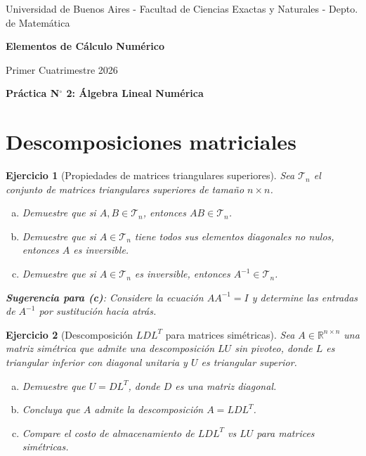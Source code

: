 \documentclass[12pt]{article}
\newtheorem{exercise}{Ejercicio}
\begin{document}
\centerline{{\small Universidad de Buenos Aires - Facultad de Ciencias Exactas y Naturales - Depto. de Matemática}}
 
 \vskip 0.2cm
 \hrulefill
 \vskip 0.2cm

 \centerline{{\bf\Huge {\sc Elementos de Cálculo Numérico}}}
 \vskip 0.2cm
 \centerline{\ttfamily Primer Cuatrimestre 2026}
 \hrulefill

 \bigskip
 \centerline{\bf Práctica N$^\circ$ 2: Álgebra Lineal Numérica}
 \bigskip

\section*{Descomposiciones matriciales}

\begin{exercise}[Propiedades de matrices triangulares superiores]
Sea $\mathcal{T}_n$ el conjunto de matrices triangulares superiores de tamaño $n \times n$.
\begin{enumerate}[(a)]
\item Demuestre que si $A, B \in \mathcal{T}_n$, entonces $AB \in \mathcal{T}_n$.
\item Demuestre que si $A \in \mathcal{T}_n$ tiene todos sus elementos diagonales no nulos, entonces $A$ es inversible.
\item Demuestre que si $A \in \mathcal{T}_n$ es inversible, entonces $A^{-1} \in \mathcal{T}_n$.
\end{enumerate}
\textbf{Sugerencia para (c)}: Considere la ecuación $AA^{-1} = I$ y determine las entradas de $A^{-1}$ por sustitución hacia atrás.
\end{exercise}

\begin{exercise}[Descomposición $LDL^T$ para matrices simétricas]
Sea $A \in \mathbb{R}^{n \times n}$ una matriz simétrica que admite una descomposición $LU$ sin pivoteo, donde $L$ es triangular inferior con diagonal unitaria y $U$ es triangular superior.
\begin{enumerate}[(a)]
\item Demuestre que $U = DL^T$, donde $D$ es una matriz diagonal.
\item Concluya que $A$ admite la descomposición $A = LDL^T$.
\item Compare el costo de almacenamiento de $LDL^T$ vs $LU$ para matrices simétricas.
\end{enumerate}
\end{exercise}
\end{document}
